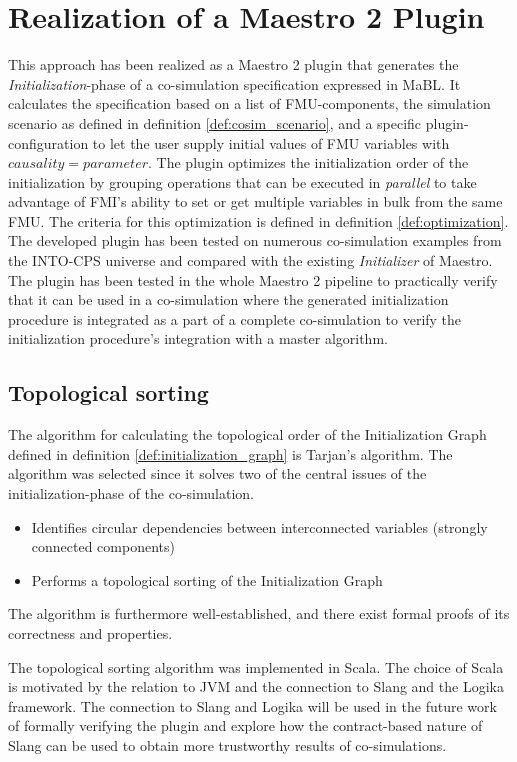 \documentclass[runningheads]{llncs}
\begin{document}
\section{Realization of a Maestro 2 Plugin}\label{sc:implementation}
This approach has been realized as a Maestro 2 plugin that generates the \textit{Initialization}-phase of a co-simulation specification expressed in MaBL. It calculates the specification based on a list of FMU-components, the simulation scenario as defined in definition \ref{def:cosim_scenario}, and a specific plugin-configuration to let the user supply initial values of FMU variables with $causality=parameter$. The plugin optimizes the initialization order of the initialization by grouping operations that can be executed in \textit{parallel} to take advantage of FMI's ability to set or get multiple variables in bulk from the same FMU. The criteria for this optimization is defined in definition \ref{def:optimization}. 
The developed plugin has been tested on numerous co-simulation examples from the INTO-CPS universe and compared with the existing \textit{Initializer} of Maestro. The plugin has been tested in the whole Maestro 2 pipeline to practically verify that it can be used in a co-simulation where the generated initialization procedure is integrated as a part of a complete co-simulation to verify the initialization procedure's integration with a master algorithm.

\subsection{Topological sorting}
The algorithm for calculating the topological order of the Initialization Graph defined in definition \ref{def:initialization_graph} is Tarjan's algorithm\cite{tarjan_1972}. The algorithm was selected since it solves two of the central issues of the initialization-phase of the co-simulation.
\begin{itemize}
    \item Identifies circular dependencies between interconnected variables (strongly connected components)
    \item Performs a topological sorting of the Initialization Graph
\end{itemize}
The algorithm is furthermore well-established, and there exist formal proofs of its correctness and properties\cite{stefan_merz}. 

The topological sorting algorithm was implemented in Scala. The choice of Scala is motivated by the relation to JVM and the connection to Slang and the Logika framework\cite{inbook}. The connection to Slang and Logika will be used in the future work of formally verifying the plugin and explore how the contract-based nature of Slang can be used to obtain more trustworthy results of co-simulations.
\end{document}
